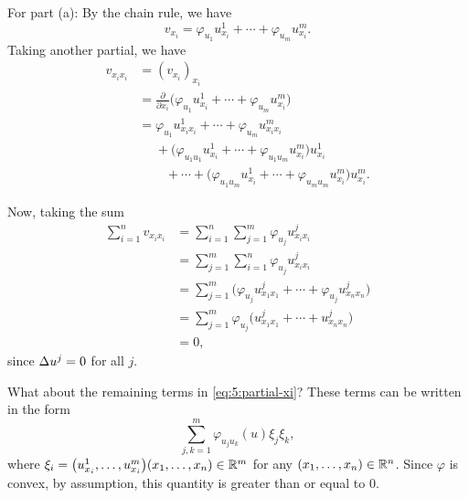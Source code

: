 \begin{solution*}
  For part (a): By the chain rule, we have
  \[
    v_{x_i}=\varphi_{u_1}u^1_{x_i}+\dotsb+\varphi_{u_m}u^m_{x_i}.
  \]
  Taking another partial, we have
  \begin{equation}
    \label{eq:5:partial-xi}
    \begin{aligned}
      v_{x_ix_i}
      &=(v_{x_i})_{x_i}\\
      &=\frac{\partial}{\partial x_i}
      \bigl(\varphi_{u_1}u^1_{x_i}+\dotsb+\varphi_{u_m}u^m_{x_i}\bigr)\\
      &=\varphi_{u_1}u^1_{x_ix_i}+\dotsb+\varphi_{u_m}u_{x_ix_i}^m\\
      &\phantom{{}={}}+\bigl(\varphi_{u_1u_1}u_{x_i}^1
      +\dotsb+\varphi_{u_1u_m}u_{x_i}^m\bigr)u_{x_i}^1\\
      &\phantom{{}=+{}}+\dotsb+\bigl(\varphi_{u_1u_m}u_{x_i}^1
      +\dotsb+\varphi_{u_mu_m}u_{x_i}^m\bigr)u_{x_i}^m.
    \end{aligned}
  \end{equation}

  Now, taking the sum
  \begin{align*}
    \sum_{i=1}^nv_{x_ix_i}
    &=\sum_{i=1}^n\sum_{j=1}^m\varphi_{u_j}u^j_{x_ix_i}\\
    &=\sum_{j=1}^m\sum_{i=1}^n\varphi_{u_j}u^j_{x_ix_i}\\
    &=\sum_{j=1}^m\bigl(\varphi_{u_j}u^j_{x_1x_1}+\dotsb+\varphi_{u_j}u^j_{x_nx_n}\bigr)\\
    &=\sum_{j=1}^m\varphi_{u_j}\bigl(u^j_{x_1x_1}+\dotsb+u^j_{x_nx_n}\bigr)\\
    &=0,
  \end{align*}
  since \(\Delta u^j=0\) for all \(j\).

  What about the remaining terms in \eqref{eq:5:partial-xi}? These terms
  can be written in the form
  \[
    \sum_{j,k=1}^m\varphi_{u_ju_k}(u)\xi_j\xi_k,
  \]
  where
  \(\xi_i=\bigl(u^1_{x_i},\dotsc,u^m_{x_i}\bigr)(x_1,\dotsc,x_n)\in\mathbb{R}^m\)
  for any \((x_1,\dotsc,x_n)\in\mathbb{R}^n\). Since \(\varphi\) is convex, by
  assumption, this quantity is greater than or equal to \(0\).


\end{solution*}
